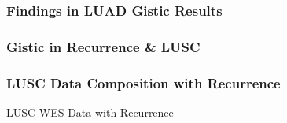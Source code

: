 \documentclass{beamer}
\begin{document}
    \begin{frame}
        \frametitle{Findings in LUAD Gistic Results}
    \end{frame}

    \subsubsection{Gistic in Recurrence \& LUSC}
    \begin{frame}
        \frametitle{LUSC Data Composition with Recurrence}

        \begin{table}
            \caption{LUSC WES Data with Recurrence}
            \resizebox{!}{0.3 \textheight}
            {}
        \end{table}
    \end{frame}
\end{document}
